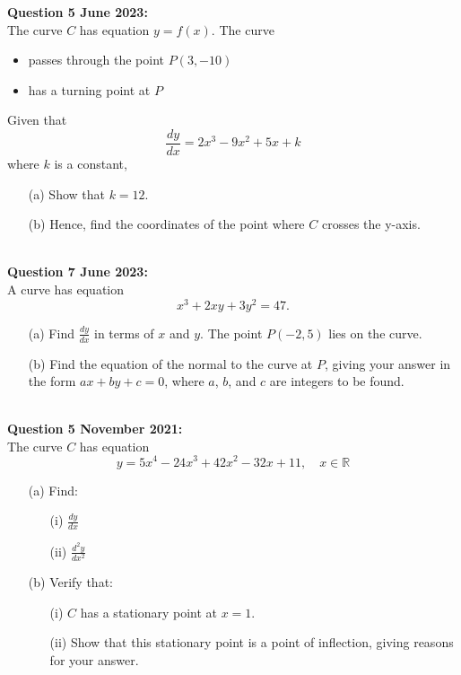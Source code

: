 \documentclass[12pt]{article}
\begin{document}
\textbf{Question 5 June 2023:}\\
The curve \( C \) has equation \( y = f(x) \). The curve
\begin{itemize}
    \item passes through the point \( P(3, -10) \)
    \item has a turning point at \( P \)
\end{itemize}

Given that 
\[\frac{dy}{dx} = 2x^3 - 9x^2 + 5x + k\]
where \( k \) is a constant,
\begin{enumerate}
    \item[(a)] Show that \( k = 12 \).
    \item[(b)] Hence, find the coordinates of the point where \( C \) crosses the y-axis.\\\\
\end{enumerate}

\textbf{Question 7 June 2023:}\\
A curve has equation
\[x^3 + 2xy + 3y^2 = 47.\]
\begin{enumerate}
    \item[(a)] Find \( \frac{dy}{dx} \) in terms of \( x \) and \( y \). 
    The point \( P(-2, 5) \) lies on the curve.    
    \item[(b)] Find the equation of the normal to the curve at \( P \), giving your answer in the form \( ax + by + c = 0 \), where \( a \), \( b \), and \( c \) are integers to be found.\\\\
\end{enumerate}

\textbf{Question 5 November 2021:}\\
The curve \( C \) has equation 
\[y = 5x^4 - 24x^3 + 42x^2 - 32x + 11, \quad x \in \mathbb{R}\]
\begin{enumerate}
    \item[(a)] Find:
    \begin{enumerate}
        \item[(i)] \( \frac{dy}{dx} \)
        \item[(ii)] \( \frac{d^2y}{dx^2} \)
    \end{enumerate}  
    \item[(b)] Verify that:
    \begin{enumerate}
        \item[(i)] \( C \) has a stationary point at \( x = 1 \).
        \item[(ii)] Show that this stationary point is a point of inflection, giving reasons for your answer.
    \end{enumerate}    
\end{enumerate}
\end{document}
